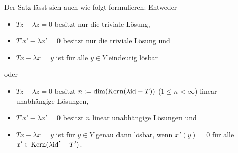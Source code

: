 \begin{Bem}
    Der Satz lässt sich auch wie folgt formulieren:
    Entweder
    \begin{itemize}
        \item
        $Tz - \lambda z = 0$ besitzt nur die triviale Lösung,

        \item
        $T'x' - \lambda x' = 0$ besitzt nur die triviale Lösung und

        \item
        $Tx - \lambda x = y$ ist für alle $y \in Y$ eindeutig lösbar
    \end{itemize}
    oder
    \begin{itemize}
        \item
        $Tz - \lambda z = 0$ besitzt $n := \dim(\text{Kern}(\lambda\text{id} - T))$
        ($1 \le n < \infty$) linear unabhängige Lösungen,

        \item
        $T'x' - \lambda x' = 0$ besitzt $n$ linear unabhängige Lösungen und

        \item
        $Tx - \lambda x = y$ ist für $y \in Y$ genau dann lösbar, wenn
        $x'(y) = 0$ für alle $x' \in \text{Kern}(\lambda\text{id}' - T')$.
    \end{itemize}
\end{Bem}

\pagebreak
